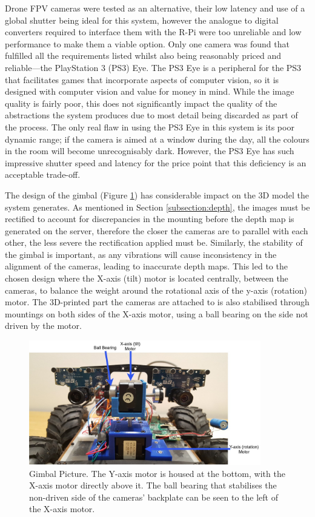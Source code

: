 Drone FPV cameras were tested as an alternative, their low latency and use of a global shutter being ideal for this system, however the analogue to digital converters required to interface them with the R-Pi were too unreliable and low performance to make them a viable option. Only one camera was found that fulfilled all the requirements listed whilst also being reasonably priced and reliable---the PlayStation 3 (PS3) Eye. The PS3 Eye is a peripheral for the PS3 that facilitates games that incorporate aspects of computer vision, so it is designed with computer vision and value for money in mind. While the image quality is fairly poor, this does not significantly impact the quality of the abstractions the system produces due to most detail being discarded as part of the process. The only real flaw in using the PS3 Eye in this system is its poor dynamic range; if the camera is aimed at a window during the day, all the colours in the room will become unrecognisably dark. However, the PS3 Eye has such impressive shutter speed and latency for the price point that this deficiency is an acceptable trade-off.

The design of the gimbal (Figure \ref{fig:gimble}) has considerable impact on the 3D model the system generates. As mentioned in Section \ref{subsection:depth}, the images must be rectified to account for discrepancies in the mounting before the depth map is generated on the server, therefore the closer the cameras are to parallel with each other, the less severe the rectification applied must be. Similarly, the stability of the gimbal is important, as any vibrations will cause inconsistency in the alignment of the cameras, leading to inaccurate depth maps. This led to the chosen design where the X-axis (tilt) motor is located centrally, between the cameras, to balance the weight around the rotational axis of the y-axis (rotation) motor. The 3D-printed part the cameras are attached to is also stabilised through mountings on both sides of the X-axis motor, using a ball bearing on the side not driven by the motor. 

\begin{figure}[H]
    \begin{center}
      \includegraphics[width=0.9\textwidth]{Figures/GimbleLabel.jpg}
      \caption[Gimbal Picture]{Gimbal Picture. The Y-axis motor is housed at the bottom, with the X-axis motor directly above it. The ball bearing that stabilises the non-driven side of the cameras' backplate can be seen to the left of the X-axis motor.}
      \label{fig:gimble}
    \end{center}
\end{figure}

